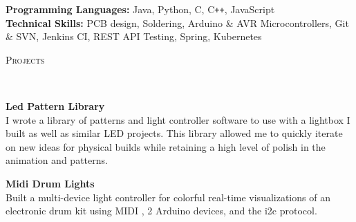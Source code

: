 \documentclass{article}
\newenvironment{changemargin}[2]{%
  \begin{list}{}{%
    \setlength{\topsep}{0pt}%
    \setlength{\leftmargin}{#1}%
    \setlength{\rightmargin}{#2}%
    \setlength{\listparindent}{\parindent}%
    \setlength{\itemindent}{\parindent}%
    \setlength{\parsep}{\parskip}%
  }%
  \item[]}{\end{list}
}
\newcommand{\lineover}{
	\begin{changemargin}{-0.05in}{-0.05in}
		\vspace*{-8pt}
		\hrulefill \\
		\vspace*{-2pt}
	\end{changemargin}
}
\newcommand{\header}[1]{
	\begin{changemargin}{-0.5in}{-0.5in}
		\scshape{#1}\\
  	\lineover
	\end{changemargin}
}
\newenvironment{body} {
	\vspace*{-16pt}
	\begin{changemargin}{-0.25in}{-0.5in}
  }	
	{\end{changemargin}
}
\begin{document}
\begin{body}
	\vspace{14pt}
	\textbf{Programming Languages:}{} Java, Python, C, C{}\verb!++!, JavaScript\\%
	\textbf{Technical Skills:}{} PCB design, Soldering, Arduino \& AVR Microcontrollers, Git \& SVN, Jenkins CI, REST API Testing, Spring, Kubernetes\\
\end{body}

\smallskip


\header{Projects}
\begin{body}
	\vspace{20pt}
	
	\vspace{8pt}
	\textbf{Led Pattern Library}\\
	I wrote a library of patterns and light controller software to use with a lightbox I built as well as similar LED projects. This library allowed me to quickly iterate on new ideas for physical builds while retaining a high level of polish in the animation and patterns.

	\vspace{8pt}
	\textbf{Midi Drum Lights}\\
	Built a multi-device light controller for colorful real-time visualizations of an electronic drum kit using MIDI , 2 Arduino devices, and the i2c protocol.
		
\end{body}
\end{document}
